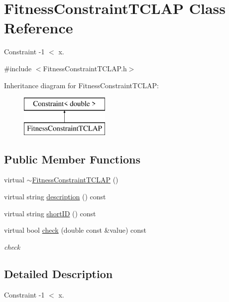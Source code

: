 \hypertarget{class_fitness_constraint_t_c_l_a_p}{}\section{Fitness\+Constraint\+T\+C\+L\+AP Class Reference}
\label{class_fitness_constraint_t_c_l_a_p}


Constraint -\/1 $<$ x.  




{\ttfamily \#include $<$Fitness\+Constraint\+T\+C\+L\+A\+P.\+h$>$}

Inheritance diagram for Fitness\+Constraint\+T\+C\+L\+AP\+:\begin{figure}[H]
\begin{center}
\leavevmode
\includegraphics[height=2.000000cm]{class_fitness_constraint_t_c_l_a_p}
\end{center}
\end{figure}
\subsection*{Public Member Functions}
\begin{DoxyCompactItemize}
\item 
virtual \hyperlink{class_fitness_constraint_t_c_l_a_p_ab93c10fccc276c8196da33f1d142e0ac}{$\sim$\+Fitness\+Constraint\+T\+C\+L\+AP} ()
\item 
virtual string \hyperlink{class_fitness_constraint_t_c_l_a_p_a95e7c197a859f649b8733b6b64e35abd}{description} () const
\item 
virtual string \hyperlink{class_fitness_constraint_t_c_l_a_p_a48d7dbb2e7260946d791b8a197a67917}{short\+ID} () const
\item 
virtual bool \hyperlink{class_fitness_constraint_t_c_l_a_p_a0725bc1fdded2825e09df3c11f0a3320}{check} (double const \&value) const
\begin{DoxyCompactList}\small\item\em check \end{DoxyCompactList}\end{DoxyCompactItemize}


\subsection{Detailed Description}
Constraint -\/1 $<$ x. 

